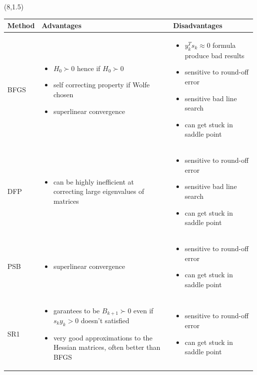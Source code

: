 \documentclass[a0]{a0poster}
\begin{document}
\begin{textblock}{7.0}(8,1.5)
\begin{flushleft}
\begin{tabular}{ p{3cm} |p{12cm}| p{12cm} }
	Method & Advantages & Disadvantages\\
	\hline
	
	BFGS & 
	\begin{itemize}
	\item $H_0\succ 0$ hence if $H_0\succ 0$
	\item self correcting property if Wolfe chosen
	\item superlinear convergence
	\end{itemize}
	&
	\begin{itemize}
		\item $y_k^Ts_k \approx 0$ formula produce bad results
		\item sensitive to round-off error
		\item sensitive bad line search
		\item can get stuck in saddle point
	\end{itemize}\\
    \hline
    

    DFP &
    \begin{itemize}
    	\item  can be highly inefficient at correcting
    	large eigenvalues of matrices
    \end{itemize}
    &
    \begin{itemize}
    	\item sensitive to round-off error
    	\item sensitive bad line search
    	\item can get stuck in saddle point
    \end{itemize}\\
	\hline
	PSB &
	\begin{itemize}
		\item superlinear convergence
	\end{itemize}
	&
	\begin{itemize}
		\item sensitive to round-off error
		\item can get stuck in saddle point
	\end{itemize}\\
\hline
SR1 &
\begin{itemize}
	\item garantees to be $B_{k+1}\succ 0$ even if $s_k y_k > 0$ doesn't satisfied
	\item very good approximations to the  Hessian matrices, often better than BFGS
\end{itemize}
&
\begin{itemize}
	\item sensitive to round-off error
	\item can get stuck in saddle point
\end{itemize}\\
	

\end{tabular}
\end{flushleft}
\end{textblock}
\end{document}
